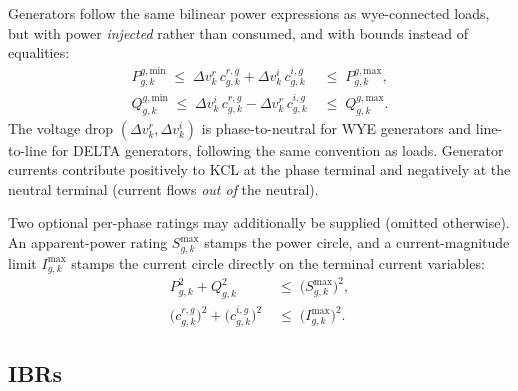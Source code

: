 \documentclass[11pt,a4paper]{article}
\newcommand{\dvr}{\Delta v^r}
\newcommand{\dvi}{\Delta v^i}
\begin{document}
Generators follow the same bilinear power expressions as wye-connected loads,
but with power \emph{injected} rather than consumed, and with bounds instead of
equalities:
%
\begin{align}
  P^{g,\text{min}}_{g,k}
  \;\leq\; \dvr_k\,c^{r,g}_{g,k} + \dvi_k\,c^{i,g}_{g,k}
  &\;\leq\; P^{g,\text{max}}_{g,k},
  \label{eq:gen-p}\\
  Q^{g,\text{min}}_{g,k}
  \;\leq\; \dvi_k\,c^{r,g}_{g,k} - \dvr_k\,c^{i,g}_{g,k}
  &\;\leq\; Q^{g,\text{max}}_{g,k}.
  \label{eq:gen-q}
\end{align}
%
The voltage drop $(\dvr_k, \dvi_k)$ is phase-to-neutral for WYE generators and
line-to-line for DELTA generators, following the same convention as loads.
Generator currents contribute positively to KCL at the phase terminal and
negatively at the neutral terminal (current flows \emph{out of} the neutral).

Two optional per-phase ratings may additionally be supplied (omitted otherwise).
An apparent-power rating $S^{\max}_{g,k}$ stamps the power circle, and a
current-magnitude limit $I^{\max}_{g,k}$ stamps the current circle directly on
the terminal current variables:
%
\begin{align}
  P_{g,k}^2 + Q_{g,k}^2 &\;\leq\; \bigl(S^{\max}_{g,k}\bigr)^2,
  \label{eq:gen-s}\\
  \bigl(c^{r,g}_{g,k}\bigr)^2 + \bigl(c^{i,g}_{g,k}\bigr)^2
  &\;\leq\; \bigl(I^{\max}_{g,k}\bigr)^2.
  \label{eq:gen-i}
\end{align}

\subsection{IBRs}
\label{sec:ibrs}
\end{document}
